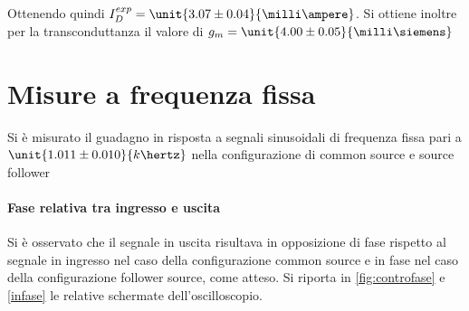 \documentclass[10pt,a4paper]{article}
\begin{document}
Ottenendo quindi $I_D^{exp} = \unit{3.07 \pm 0.04}{\milli\ampere}$. Si ottiene inoltre per la transconduttanza il valore di $g_m = \unit{4.00 \pm 0.05}{\milli\siemens}$

\section{Misure a frequenza fissa}

Si è misurato il guadagno in risposta a segnali sinusoidali di frequenza fissa pari a $\unit{1.011 \pm 0.010}{k\hertz}$ nella configurazione di common source e source follower

\paragraph{Fase relativa tra ingresso e uscita} Si è osservato che il segnale in uscita risultava in opposizione di fase rispetto al segnale in ingresso nel caso della configurazione common source e in fase nel caso della configurazione follower source, come atteso. Si riporta in \figurename{\ref{fig:controfase}} e \figurename{\ref{infase}} le relative schermate dell'oscilloscopio.
\end{document}
